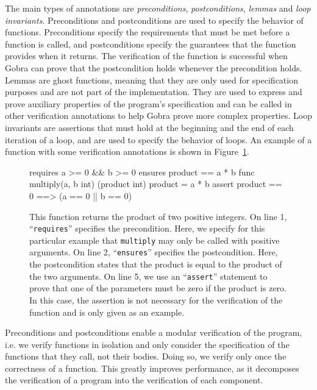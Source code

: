 The main types of annotations are \emph{preconditions}, \emph{postconditions}, \emph{lemmas} and \emph{loop invariants}.
Preconditions and postconditions are used to specify the behavior of functions. Preconditions specify the requirements that must be met before a function is called, and postconditions specify the guarantees that the function provides when it returns.
The verification of the function is successful when Gobra can prove that the postcondition holds whenever the precondition holds.
Lemmas are ghost functions, meaning that they are only used for specification purposes and are not part of the implementation.
They are used to express and prove auxiliary properties of the program's specification and can be called in other verification annotations to help Gobra prove more complex properties.
Loop invariants are assertions that must hold at the beginning and the end of each iteration of a loop, and are used to specify the behavior of loops.
An example of a function with some verification annotations is shown in Figure~\ref{lst:multiply-example}.

\begin{figure}
    \begin{gobra}
requires a >= 0 && b >= 0
ensures  product == a * b
func multiply(a, b int) (product int) {
    product = a * b
    assert product == 0 ==> (a == 0 || b == 0)
}
    \end{gobra}
    \caption{This function returns the product of two positive integers. On line 1, “\texttt{requires}” specifies the precondition. Here, we specify for this particular example that \texttt{multiply} may only be called with positive arguments. On line 2, “\texttt{ensures}” specifies the postcondition. Here, the postcondition states that the product is equal to the product of the two arguments. On line 5, we use an “\texttt{assert}” statement to prove that one of the parameters must be zero if the product is zero. In this case, the assertion is not necessary for the verification of the function and is only given as an example.}
    \label{lst:multiply-example}
\end{figure}

Preconditions and postconditions enable a modular verification of the program, i.e. we verify functions in isolation and only consider the specification of the functions that they call, not their bodies.
Doing so, we verify only once the correctness of a function.
This greatly improves performance, as it decomposes the verification of a program into the verification of each component.

